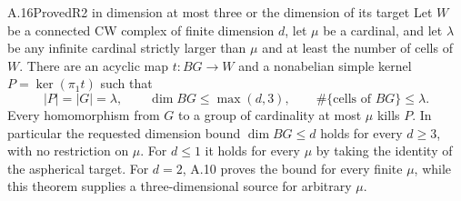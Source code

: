 \begin{claim}{A.16}{Proved}{R2 in dimension at most three or the dimension of its target}
Let $W$ be a connected CW complex of finite dimension $d$, let
$\mu$ be a cardinal, and let $\lambda$ be any infinite cardinal
strictly larger than $\mu$ and at least the number of cells of
$W$. There are an acyclic map $t:BG\to W$ and a nonabelian
simple kernel $P=\ker(\pi_1t)$ such that
\[
 |P|=|G|=\lambda,
 \qquad
 \dim BG\leq\max(d,3),
 \qquad
 \#\{\text{cells of }BG\}\leq\lambda.
\]
Every homomorphism from $G$ to a group of cardinality at most
$\mu$ kills $P$. In particular the requested dimension bound
$\dim BG\leq d$ holds for every $d\geq3$, with no restriction
on $\mu$. For $d\leq1$ it holds for every $\mu$ by taking the
identity of the aspherical target. For $d=2$, A.10 proves the
bound for every finite $\mu$, while this theorem supplies a
three-dimensional source for arbitrary $\mu$.
\end{claim}
